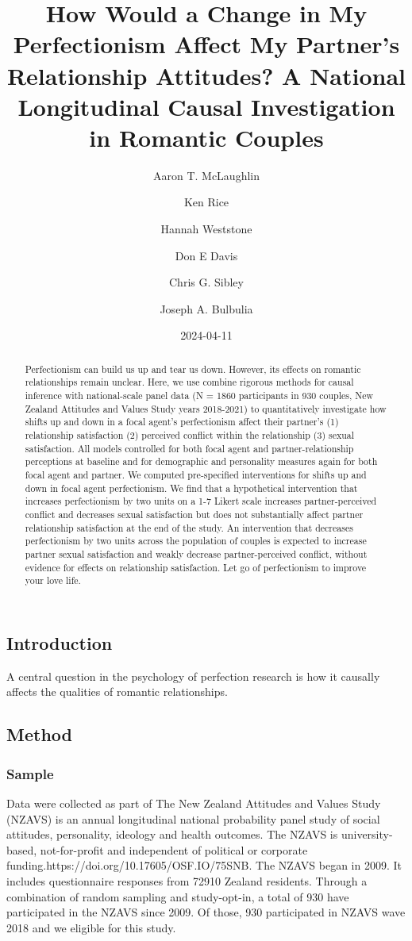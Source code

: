 \documentclass[
  singlecolumn]{article}
\title{How Would a Change in My Perfectionism Affect My Partner's
Relationship Attitudes? A National Longitudinal Causal Investigation in
Romantic Couples}
\author{Aaron T. McLaughlin \and Ken Rice \and Hannah Weststone \and Don
E Davis \and Chris G. Sibley \and Joseph A. Bulbulia}
\date{2024-04-11}
\begin{document}
\maketitle
\begin{abstract}
Perfectionism can build us up and tear us down. However, its effects on
romantic relationships remain unclear. Here, we use combine rigorous
methods for causal inference with national-scale panel data (N = 1860
participants in 930 couples, New Zealand Attitudes and Values Study
years 2018-2021) to quantitatively investigate how shifts up and down in
a focal agent's perfectionism affect their partner's (1) relationship
satisfaction (2) perceived conflict within the relationship (3) sexual
satisfaction. All models controlled for both focal agent and
partner-relationship perceptions at baseline and for demographic and
personality measures again for both focal agent and partner. We computed
pre-specified interventions for shifts up and down in focal agent
perfectionism. We find that a hypothetical intervention that increases
perfectionism by two units on a 1-7 Likert scale increases
partner-perceived conflict and decreases sexual satisfaction but does
not substantially affect partner relationship satisfaction at the end of
the study. An intervention that decreases perfectionism by two units
across the population of couples is expected to increase partner sexual
satisfaction and weakly decrease partner-perceived conflict, without
evidence for effects on relationship satisfaction. Let go of
perfectionism to improve your love life.
\end{abstract}

\subsection{Introduction}\label{introduction}

A central question in the psychology of perfection research is how it
causally affects the qualities of romantic relationships.

\subsection{Method}\label{method}

\subsubsection{Sample}\label{sample}

Data were collected as part of The New Zealand Attitudes and Values
Study (NZAVS) is an annual longitudinal national probability panel study
of social attitudes, personality, ideology and health outcomes. The
NZAVS is university-based, not-for-profit and independent of political
or corporate funding.https://doi.org/10.17605/OSF.IO/75SNB. The NZAVS
began in 2009. It includes questionnaire responses from 72910 Zealand
residents. Through a combination of random sampling and study-opt-in, a
total of 930 have participated in the NZAVS since 2009. Of those, 930
participated in NZAVS wave 2018 and we eligible for this study.
\end{document}
